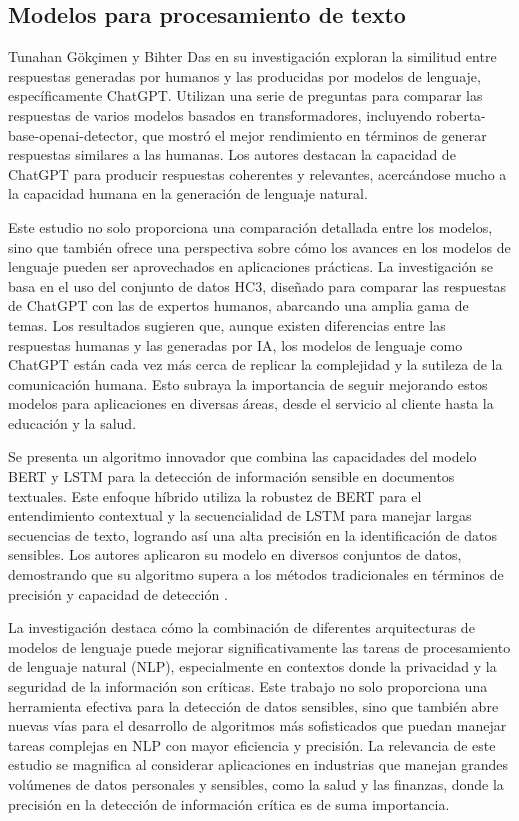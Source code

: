 \subsection{Modelos para procesamiento de texto}

Tunahan Gökçimen y Bihter Das \cite{Gokcimen2023} en su investigación exploran la similitud entre respuestas generadas por humanos y las producidas por modelos de lenguaje, específicamente ChatGPT. Utilizan una serie de preguntas para comparar las respuestas de varios modelos basados en transformadores, incluyendo roberta-base-openai-detector, que mostró el mejor rendimiento en términos de generar respuestas similares a las humanas. Los autores destacan la capacidad de ChatGPT para producir respuestas coherentes y relevantes, acercándose mucho a la capacidad humana en la generación de lenguaje natural.

Este estudio no solo proporciona una comparación detallada entre los modelos, sino que también ofrece una perspectiva sobre cómo los avances en los modelos de lenguaje pueden ser aprovechados en aplicaciones prácticas. La investigación se basa en el uso del conjunto de datos HC3, diseñado para comparar las respuestas de ChatGPT con las de expertos humanos, abarcando una amplia gama de temas. Los resultados sugieren que, aunque existen diferencias entre las respuestas humanas y las generadas por IA, los modelos de lenguaje como ChatGPT están cada vez más cerca de replicar la complejidad y la sutileza de la comunicación humana. Esto subraya la importancia de seguir mejorando estos modelos para aplicaciones en diversas áreas, desde el servicio al cliente hasta la educación y la salud.

Se presenta un algoritmo innovador que combina las capacidades del modelo BERT y LSTM para la detección de información sensible en documentos textuales. Este enfoque híbrido utiliza la robustez de BERT para el entendimiento contextual y la secuencialidad de LSTM para manejar largas secuencias de texto, logrando así una alta precisión en la identificación de datos sensibles. Los autores aplicaron su modelo en diversos conjuntos de datos, demostrando que su algoritmo supera a los métodos tradicionales en términos de precisión y capacidad de detección \cite{Muralitharan2024}.

La investigación destaca cómo la combinación de diferentes arquitecturas de modelos de lenguaje puede mejorar significativamente las tareas de procesamiento de lenguaje natural (NLP), especialmente en contextos donde la privacidad y la seguridad de la información son críticas. Este trabajo no solo proporciona una herramienta efectiva para la detección de datos sensibles, sino que también abre nuevas vías para el desarrollo de algoritmos más sofisticados que puedan manejar tareas complejas en NLP con mayor eficiencia y precisión. La relevancia de este estudio se magnifica al considerar aplicaciones en industrias que manejan grandes volúmenes de datos personales y sensibles, como la salud y las finanzas, donde la precisión en la detección de información crítica es de suma importancia.

